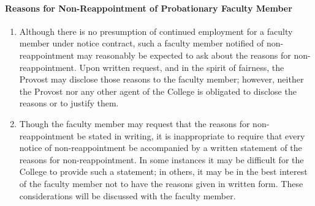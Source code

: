 			\paragraph{Reasons for Non-Reappointment of Probationary Faculty Member}
				\label{sec:ReasonsForNonReappointmentOfProbationaryFacultyMember}
				\begin{enumerate}[label=\alph*)]
					\item{
						\label{par:ReasonsForNonReappointmentOfProbationaryFacultyMember-a}
						Although there is no presumption of continued employment for a faculty member under notice contract, such a faculty member notified of non-reappointment may reasonably be expected to ask about the reasons for non-reappointment.  Upon written request, and in the spirit of fairness, the Provost may disclose those reasons to the faculty member; however, neither the Provost nor any other agent of the College is obligated to disclose the reasons or to justify them.}
					\item{Though the faculty member may request that the reasons for non-reappointment be stated in writing, it is inappropriate to require that every notice of non-reappointment be accompanied by a written statement of the reasons for non-reappointment.  In some instances it may be difficult for the College to provide such a statement; in others, it may be in the best interest of the faculty member not to have the reasons given in written form.  These considerations will be discussed with the faculty member.}
				\end{enumerate}
